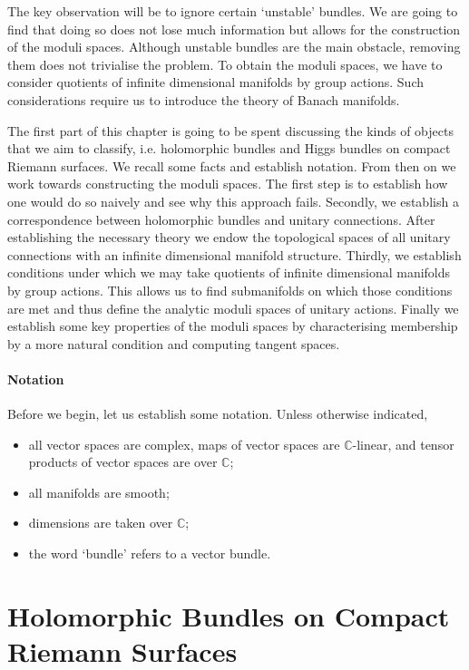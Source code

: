 \documentclass[12pt]{ociamthesis}  %
\begin{document}
The key observation will be to ignore certain `unstable' bundles. We
are going to find that doing so does not lose much information but
allows for the construction of the moduli spaces. Although unstable
bundles are the main obstacle, removing them does not trivialise the
problem. To obtain the moduli spaces, we have to consider quotients
of infinite dimensional manifolds by group actions. Such considerations
require us to introduce the theory of Banach manifolds.

The first part of this chapter is going to be spent discussing the kinds of
objects that we aim to classify, i.e. holomorphic bundles and Higgs
bundles on compact Riemann surfaces. We recall some facts and establish
notation. From then on we work towards constructing the moduli spaces.
The first step is to establish how one would do so naively and
see why this approach fails. Secondly, we establish a correspondence
between holomorphic bundles and unitary connections. After establishing the necessary
theory we endow the topological spaces of all unitary connections
with an infinite dimensional manifold structure. Thirdly, we establish
conditions under which we may take quotients of infinite dimensional
manifolds by group actions. This allows us to find submanifolds on which
those conditions are met and thus define the analytic moduli spaces of
unitary actions. Finally we establish some key properties of the
moduli spaces by characterising membership by a more natural
condition and computing tangent spaces.

\paragraph*{Notation}

Before we begin, let us establish some notation. Unless otherwise
indicated,

\begin{itemize}
  \item all vector spaces are complex, maps of vector spaces are
        $\mathbb{C}$-linear, and tensor products of vector spaces are
        over $\mathbb{C}$;
  \item all manifolds are smooth;
  \item dimensions are taken over $\mathbb{C}$;
  \item the word `bundle' refers to a vector bundle.
\end{itemize}

\section{Holomorphic Bundles on Compact Riemann Surfaces}
\end{document}
